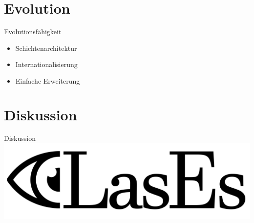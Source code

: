 \documentclass{beamer}
\begin{document}
    \section{Evolution}
    \begin{frame}{Evolutionsfähigkeit}
        \begin{itemize}
            \item Schichtenarchitektur
            \item Internationalisierung
            \item Einfache Erweiterung
        \end{itemize}
    \end{frame}

    \section{Diskussion}
    \begin{frame}{Diskussion}
        \includegraphics[width=\textwidth]{../../docs/Pflichtenheft/graphics/LasEs-logo}
    \end{frame}
\end{document}
